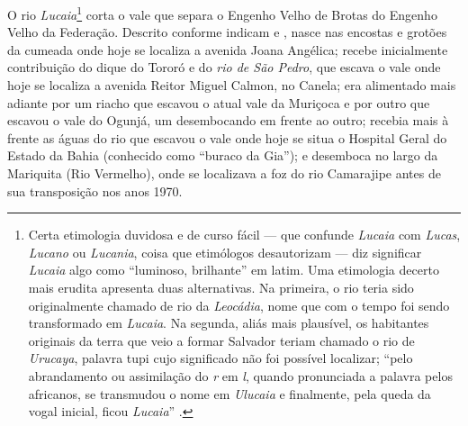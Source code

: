 O rio \textit{Lucaia}\footnote{Certa etimologia duvidosa e de curso fácil --- que confunde \textit{Lucaia} com \textit{Lucas}, \textit{Lucano} ou \textit{Lucania}, coisa que etimólogos desautorizam \cite{guerios_nomes_1981} --- diz significar \textit{Lucaia} algo como ``luminoso, brilhante'' em latim. Uma etimologia decerto mais erudita apresenta duas alternativas. Na primeira, o rio teria sido originalmente chamado de rio da \textit{Leocádia}, nome que com o tempo foi sendo transformado em \textit{Lucaia}. Na segunda, aliás mais plausível, os habitantes originais da terra que veio a formar Salvador teriam chamado o rio de \textit{Urucaya}, palavra tupi cujo significado não foi possível localizar; ``pelo abrandamento ou assimilação do \textit{r} em \textit{l}, quando pronunciada a palavra pelos africanos, se transmudou o nome em \textit{Ulucaia} e finalmente, pela queda da vogal inicial, ficou \textit{Lucaia}'' \cite[p.~68]{amaral_resumo_2013}.} corta o vale que separa o Engenho Velho de Brotas do Engenho Velho da Federação. Descrito conforme indicam  e , nasce nas encostas e grotões da cumeada onde hoje se localiza a avenida Joana Angélica; recebe inicialmente contribuição do dique do Tororó e do \textit{rio de São Pedro}, que escava o vale onde hoje se localiza a avenida Reitor Miguel Calmon, no Canela; era alimentado mais adiante por um riacho que escavou o atual vale da Muriçoca e por outro que escavou o vale do Ogunjá, um desembocando em frente ao outro; recebia mais à frente as águas do rio que escavou o vale onde hoje se situa o Hospital Geral do Estado da Bahia (conhecido como ``buraco da Gia''); e desemboca no largo da Mariquita (Rio Vermelho), onde se localizava a foz do rio Camarajipe antes de sua transposição nos anos 1970.

